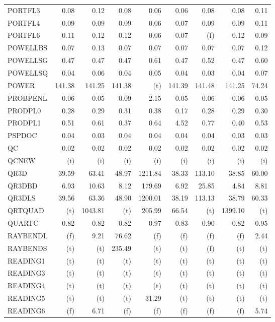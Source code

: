 \documentclass[11pt,twoside]{article}
\begin{document}
{\begin{longtable}[c]{|l|r|r|r|r|r|r|r|r|}
PORTFL3 & 0.08 & 0.12 & 0.08 & 0.06 & 0.06 & 0.08 & 0.08 & 0.11 \\
PORTFL4 & 0.09 & 0.09 & 0.09 & 0.06 & 0.07 & 0.09 & 0.09 & 0.11 \\
PORTFL6 & 0.11 & 0.12 & 0.12 & 0.06 & 0.07 & (f) & 0.12 & 0.09 \\
POWELLBS & 0.07 & 0.13 & 0.07 & 0.07 & 0.07 & 0.07 & 0.07 & 0.12 \\
POWELLSG & 0.47 & 0.47 & 0.47 & 0.61 & 0.47 & 0.52 & 0.47 & 0.60 \\
POWELLSQ & 0.04 & 0.06 & 0.04 & 0.05 & 0.04 & 0.03 & 0.04 & 0.07 \\
POWER & 141.38 & 141.25 & 141.38 & (t) & 141.39 & 141.48 & 141.25 & 74.24 \\
PROBPENL & 0.06 & 0.05 & 0.09 & 2.15 & 0.05 & 0.06 & 0.06 & 0.05 \\
PRODPL0 & 0.28 & 0.29 & 0.31 & 0.38 & 0.17 & 0.28 & 0.29 & 0.30 \\
PRODPL1 & 0.51 & 0.61 & 0.37 & 0.64 & 4.52 & 0.77 & 0.40 & 0.53 \\
PSPDOC & 0.04 & 0.03 & 0.04 & 0.04 & 0.04 & 0.04 & 0.03 & 0.03 \\
QC & 0.02 & 0.02 & 0.02 & 0.02 & 0.02 & 0.02 & 0.02 & 0.02 \\
QCNEW & (i) & (i) & (i) & (i) & (i) & (i) & (i) & (i) \\
QR3D & 39.59 & 63.41 & 48.97 & 1211.84 & 38.33 & 113.10 & 38.85 & 60.00 \\
QR3DBD & 6.93 & 10.63 & 8.12 & 179.69 & 6.92 & 25.85 & 4.84 & 8.81 \\
QR3DLS & 39.56 & 63.36 & 48.90 & 1200.01 & 38.19 & 113.13 & 38.79 & 60.33 \\
QRTQUAD & (t) & 1043.81 & (t) & 205.99 & 66.54 & (t) & 1399.10 & (t) \\
QUARTC & 0.82 & 0.82 & 0.82 & 0.97 & 0.83 & 0.90 & 0.82 & 0.95 \\
RAYBENDL & (f) & 9.21 & 76.62 & (f) & (f) & (f) & (f) & 2.44 \\
RAYBENDS & (t) & (t) & 235.49 & (t) & (t) & (f) & (t) & (t) \\
READING1 & (t) & (t) & (t) & (t) & (t) & (t) & (t) & (t) \\
READING3 & (t) & (t) & (t) & (t) & (t) & (t) & (t) & (t) \\
READING4 & (t) & (t) & (t) & (t) & (t) & (t) & (t) & (t) \\
READING5 & (t) & (t) & (t) & 31.29 & (t) & (t) & (t) & (t) \\
READING6 & (f) & 6.71 & (f) & (f) & (f) & (f) & (f) & 5.74 \\

\end{longtable}}
\end{document}
